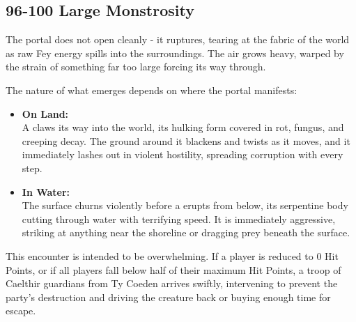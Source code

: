 \subsection*{96-100 Large Monstrosity}
{\entryfont The portal does not open cleanly - it ruptures, tearing at the fabric of the world as raw Fey energy spills into the surroundings. The air grows heavy, warped by the strain of something far too large forcing its way through.

The nature of what emerges depends on where the portal manifests:
\begin{itemize}
	\item \textbf{On Land:}\\A \hyperref[monster:BeastOfBlight]{} claws its way into the world, its hulking form covered in rot, fungus, and creeping decay. The ground around it blackens and twists as it moves, and it immediately lashes out in violent hostility, spreading corruption with every step.
	\item \textbf{In Water:}\\The surface churns violently before a \hyperref[monster:Wellwyrm]{} erupts from below, its serpentine body cutting through water with terrifying speed. It is immediately aggressive, striking at anything near the shoreline or dragging prey beneath the surface.
\end{itemize}
This encounter is intended to be overwhelming. If a player is reduced to 0 Hit Points, or if all players fall below half of their maximum Hit Points, a troop of Caelthir guardians from Ty Coeden arrives swiftly, intervening to prevent the party's destruction and driving the creature back or buying enough time for escape.}